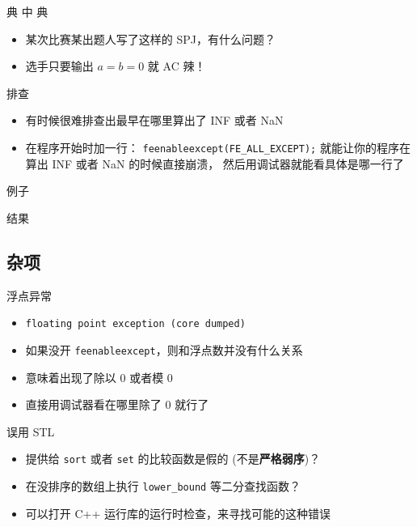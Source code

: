 \documentclass[10pt,mathserif]{beamer}
\newcommand{\lstcode}[1] {  }
\newcommand{\lstterm}[1] {  }
\begin{document}
\begin{frame}{典 中 典}
	\begin{itemize}
		\item 某次比赛某出题人写了这样的 SPJ，有什么问题？
			\lstcode{spj-hacked-by-nan.cc}
			\pause
		\item 选手只要输出 $a = b = 0$ 就 AC 辣！
	\end{itemize}
\end{frame}

\begin{frame}{排查}
	\begin{itemize}
		\item 有时候很难排查出最早在哪里算出了 INF 或者 NaN
		\item 在程序开始时加一行：
			\lstinline{feenableexcept(FE_ALL_EXCEPT);}
			就能让你的程序在算出 INF 或者 NaN 的时候直接崩溃，
			然后用调试器就能看具体是哪一行了
	\end{itemize}
\end{frame}

\begin{frame}{例子}
	\lstcode{feenableexcept.cc}
\end{frame}

\begin{frame}{结果}
	\lstterm{feenableexcept.out}
\end{frame}

\subsection{杂项}
\begin{frame}{浮点异常}
	\begin{itemize}
		\item \lstinline{floating point exception (core dumped)}
		\item 如果没开 \lstinline{feenableexcept}，则和浮点数并没有什么关系
		\item 意味着出现了除以 $0$ 或者模 $0$
		\item 直接用调试器看在哪里除了 $0$ 就行了
	\end{itemize}
\end{frame}

\begin{frame}{误用 STL}
	\begin{itemize}
		\item 提供给 \lstinline|sort| 或者 \lstinline|set|
			的比较函数是假的 (不是\textbf{严格弱序})？
		\item 在没排序的数组上执行 \lstinline|lower_bound| 等二分查找函数？
		\item 可以打开 C++ 运行库的运行时检查，来寻找可能的这种错误
	\end{itemize}
\end{frame}
\end{document}

